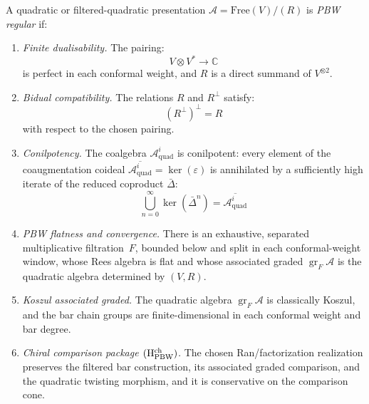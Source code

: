 \begin{definition}\label{def:quadratic-regularity}
A quadratic or filtered-quadratic presentation
$\mathcal{A}=\text{Free}(V)/(R)$ is \emph{PBW regular} if:
\begin{enumerate}
\item \emph{Finite dualisability.} The pairing:
 \[V \otimes V^* \to \mathbb{C}\]
 is perfect in each conformal weight, and $R$ is a direct summand of
 $V^{\otimes 2}$.

\item \emph{Bidual compatibility.} The relations $R$ and $R^\perp$ satisfy:
 \[(R^\perp)^\perp = R\]
 with respect to the chosen pairing.

\item \emph{Conilpotency.} The coalgebra $\mathcal{A}^i_{\mathrm{quad}}$ is conilpotent: every element
 of the coaugmentation coideal
 $\overline{\mathcal{A}^i_{\mathrm{quad}}} = \ker(\varepsilon)$ is
 annihilated by a sufficiently high iterate of the reduced coproduct $\bar{\Delta}$:
 \[\bigcup_{n=0}^\infty \ker(\bar{\Delta}^n) =
 \overline{\mathcal{A}^i_{\mathrm{quad}}}\]

\item \emph{PBW flatness and convergence.} There is an exhaustive,
 separated multiplicative filtration~$F$, bounded below and split in
 each conformal-weight window, whose Rees algebra is flat and whose associated graded
 $\operatorname{gr}_F\mathcal A$ is the quadratic algebra
 determined by $(V,R)$.

\item \emph{Koszul associated graded.} The quadratic algebra
 $\operatorname{gr}_F\mathcal A$ is classically Koszul, and the
 bar chain groups are finite-dimensional in each conformal
 weight and bar degree.

\item \emph{Chiral comparison package
 $({\rm H}^{\rm ch}_{\rm PBW})$.}  The chosen Ran/factorization
 realization preserves the filtered bar construction, its associated
 graded comparison, and the quadratic twisting morphism, and it is
 conservative on the comparison cone.
\end{enumerate}
\end{definition}


